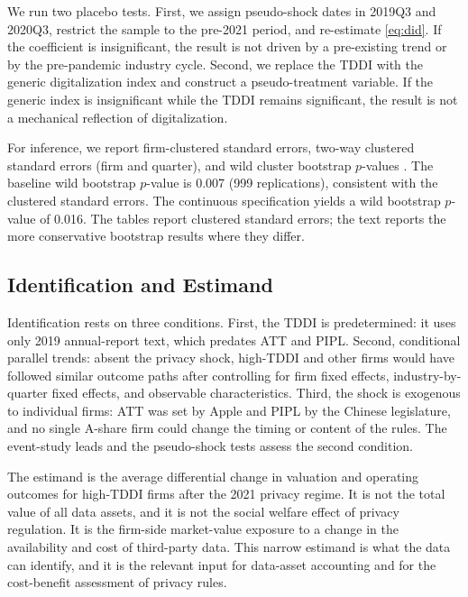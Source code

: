 We run two placebo tests. First, we assign pseudo-shock dates in 2019Q3 and 2020Q3, restrict the sample to the pre-2021 period, and re-estimate \eqref{eq:did}. If the coefficient is insignificant, the result is not driven by a pre-existing trend or by the pre-pandemic industry cycle. Second, we replace the TDDI with the generic digitalization index and construct a pseudo-treatment variable. If the generic index is insignificant while the TDDI remains significant, the result is not a mechanical reflection of digitalization.

For inference, we report firm-clustered standard errors, two-way clustered standard errors (firm and quarter), and wild cluster bootstrap $p$-values \cite{mackinnon2017}. The baseline wild bootstrap $p$-value is 0.007 (999 replications), consistent with the clustered standard errors. The continuous specification yields a wild bootstrap $p$-value of 0.016. The tables report clustered standard errors; the text reports the more conservative bootstrap results where they differ.

\subsection{Identification and Estimand}

Identification rests on three conditions. First, the TDDI is predetermined: it uses only 2019 annual-report text, which predates ATT and PIPL. Second, conditional parallel trends: absent the privacy shock, high-TDDI and other firms would have followed similar outcome paths after controlling for firm fixed effects, industry-by-quarter fixed effects, and observable characteristics. Third, the shock is exogenous to individual firms: ATT was set by Apple and PIPL by the Chinese legislature, and no single A-share firm could change the timing or content of the rules. The event-study leads and the pseudo-shock tests assess the second condition.

The estimand is the average differential change in valuation and operating outcomes for high-TDDI firms after the 2021 privacy regime. It is not the total value of all data assets, and it is not the social welfare effect of privacy regulation. It is the firm-side market-value exposure to a change in the availability and cost of third-party data. This narrow estimand is what the data can identify, and it is the relevant input for data-asset accounting and for the cost-benefit assessment of privacy rules.
